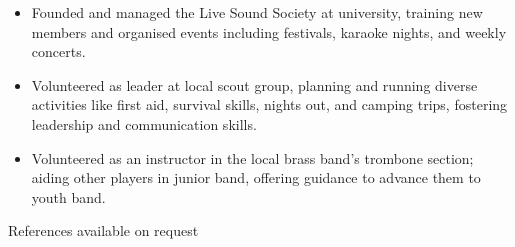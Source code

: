 \documentclass{my_cv}
\begin{document}
\begin{multicols}{2}
\begin{itemize}[noitemsep]
    \item Founded and managed the Live Sound Society at university, training new members and organised events including festivals, karaoke nights, and weekly concerts.
    \item Volunteered as leader at local scout group, planning and running diverse activities like first aid, survival skills, nights out, and camping trips, fostering leadership and communication skills.
    \item Volunteered as an instructor in the local brass band's trombone section; aiding other players in junior band, offering guidance to advance them to youth band.
\end{itemize}

\end{multicols}

\begin{center}
References available on request
\end{center}
\end{document}
